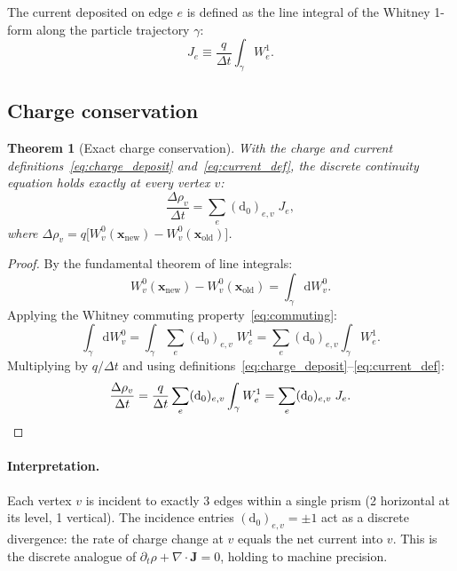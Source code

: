 \documentclass[11pt,a4paper]{article}
\newtheorem{theorem}{Theorem}[section]
\newcommand{\dd}{\mathrm{d}}
\begin{document}
The current deposited on edge $e$ is defined as the line integral of the
Whitney 1-form along the particle trajectory $\gamma$:
\begin{equation}
  J_e \equiv \frac{q}{\Delta t} \int_\gamma W^1_e.
  \label{eq:current_def}
\end{equation}

\subsection{Charge conservation}
\label{sec:conservation}

\begin{theorem}[Exact charge conservation]
\label{thm:conservation}
With the charge and current definitions~\eqref{eq:charge_deposit}
and~\eqref{eq:current_def}, the discrete continuity equation holds exactly at
every vertex $v$:
\begin{equation}
  \boxed{
    \frac{\Delta\rho_v}{\Delta t} = \sum_e (\dd_0)_{e,v}\;J_e,
  }
  \label{eq:charge_conservation}
\end{equation}
where $\Delta\rho_v = q\bigl[W^0_v(\bm{x}_\text{new}) -
W^0_v(\bm{x}_\text{old})\bigr]$.
\end{theorem}

\begin{proof}
By the fundamental theorem of line integrals:
\begin{equation}
  W^0_v(\bm{x}_\text{new}) - W^0_v(\bm{x}_\text{old})
    = \int_\gamma \dd W^0_v.
\end{equation}
Applying the Whitney commuting property~\eqref{eq:commuting}:
\begin{equation}
  \int_\gamma \dd W^0_v
    = \int_\gamma \sum_e (\dd_0)_{e,v}\;W^1_e
    = \sum_e (\dd_0)_{e,v} \int_\gamma W^1_e.
\end{equation}
Multiplying by $q/\Delta t$ and using
definitions~\eqref{eq:charge_deposit}--\eqref{eq:current_def}:
\begin{equation}
  \frac{\Delta\rho_v}{\Delta t}
    = \frac{q}{\Delta t}\sum_e (\dd_0)_{e,v} \int_\gamma W^1_e
    = \sum_e (\dd_0)_{e,v}\;J_e. \qedhere
\end{equation}
\end{proof}

\paragraph{Interpretation.}
Each vertex $v$ is incident to exactly 3 edges within a single prism
(2 horizontal at its level, 1 vertical). The incidence entries
$(\dd_0)_{e,v} = \pm 1$ act as a discrete divergence: the rate of charge
change at $v$ equals the net current into $v$. This is the discrete
analogue of $\partial_t \rho + \nabla \cdot \bm{J} = 0$, holding to machine
precision.
\end{document}
